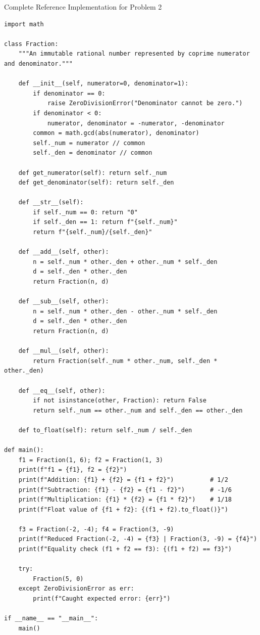 \documentclass[11pt,a4paper]{article}
\begin{document}
\begin{solbox}{Complete Reference Implementation for Problem 2}
\begin{lstlisting}
import math

class Fraction:
    """An immutable rational number represented by coprime numerator and denominator."""

    def __init__(self, numerator=0, denominator=1):
        if denominator == 0:
            raise ZeroDivisionError("Denominator cannot be zero.")
        if denominator < 0:
            numerator, denominator = -numerator, -denominator
        common = math.gcd(abs(numerator), denominator)
        self._num = numerator // common
        self._den = denominator // common

    def get_numerator(self): return self._num
    def get_denominator(self): return self._den

    def __str__(self):
        if self._num == 0: return "0"
        if self._den == 1: return f"{self._num}"
        return f"{self._num}/{self._den}"

    def __add__(self, other):
        n = self._num * other._den + other._num * self._den
        d = self._den * other._den
        return Fraction(n, d)

    def __sub__(self, other):
        n = self._num * other._den - other._num * self._den
        d = self._den * other._den
        return Fraction(n, d)

    def __mul__(self, other):
        return Fraction(self._num * other._num, self._den * other._den)

    def __eq__(self, other):
        if not isinstance(other, Fraction): return False
        return self._num == other._num and self._den == other._den

    def to_float(self): return self._num / self._den

def main():
    f1 = Fraction(1, 6); f2 = Fraction(1, 3)
    print(f"f1 = {f1}, f2 = {f2}")
    print(f"Addition: {f1} + {f2} = {f1 + f2}")          # 1/2
    print(f"Subtraction: {f1} - {f2} = {f1 - f2}")       # -1/6
    print(f"Multiplication: {f1} * {f2} = {f1 * f2}")    # 1/18
    print(f"Float value of {f1 + f2}: {(f1 + f2).to_float()}")

    f3 = Fraction(-2, -4); f4 = Fraction(3, -9)
    print(f"Reduced Fraction(-2, -4) = {f3} | Fraction(3, -9) = {f4}")
    print(f"Equality check (f1 + f2 == f3): {(f1 + f2) == f3}")

    try:
        Fraction(5, 0)
    except ZeroDivisionError as err:
        print(f"Caught expected error: {err}")

if __name__ == "__main__":
    main()
\end{lstlisting}
\end{solbox}
\end{document}
